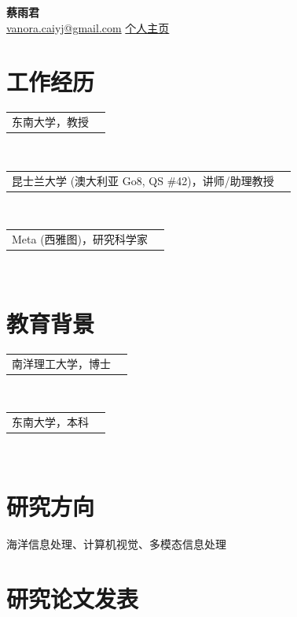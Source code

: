 \documentclass[UTF8,a4paper,11pt,fontset=fandol]{ctexart}
\makeatletter
\newcommand{\rSection}[1]{\section*{#1}}
\newcommand{\cvDateRange}[2]{\makebox[4.4em][l]{#1}\makebox[1.4em][c]{-}\makebox[4.4em][l]{#2}}
\newcommand{\cvExperience}[3]{\item\begin{tabularx}{\linewidth}[t]{@{}Xr@{}}#1 & #2\end{tabularx}\if\relax\detokenize{#3}\relax\else\\[-1pt]#3\fi}
\makeatother
\begin{document}
\begin{center}
{\LARGE\bfseries 蔡雨君}\\[6pt]
\href{mailto:vanora.caiyj@gmail.com}{vanora.caiyj@gmail.com}
\quad\href{https://vanoracai.github.io/}{个人主页}
\end{center}
\rSection{工作经历}
\begin{experience}
\cvExperience{东南大学，教授}{\cvDateRange{2026 年}{至今}}{}
\cvExperience{昆士兰大学 (澳大利亚 Go8, QS \#42)，讲师/助理教授}{\cvDateRange{2024 年}{2026 年}}{}
\cvExperience{Meta (西雅图)，研究科学家}{\cvDateRange{2022 年}{2024 年}}{}
\end{experience}
\rSection{教育背景}
\begin{experience}
\cvExperience{南洋理工大学，博士}{\cvDateRange{2017 年}{2021 年}}{}
\cvExperience{东南大学，本科}{\cvDateRange{2013 年}{2017 年}}{}
\end{experience}
\rSection{研究方向}
海洋信息处理、计算机视觉、多模态信息处理
\rSection{研究论文发表}
\end{document}
